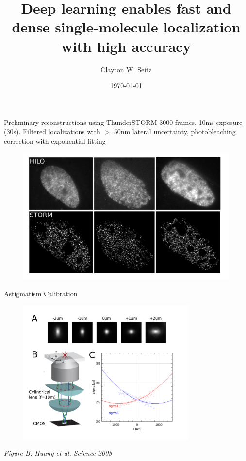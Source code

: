 \documentclass{beamer}			%
\title{Deep learning enables fast and dense single-molecule localization with high accuracy}	%
\author{Clayton W. Seitz}								%
\date{\today}									%
\begin{document}
\begin{frame}
  \titlepage
\end{frame}


%

\begin{frame}{Preliminary reconstructions using ThunderSTORM}
3000 frames, 10ms exposure (30s). Filtered localizations with $>$ 50nm lateral uncertainty, photobleaching correction with exponential fitting
\begin{figure}
\includegraphics[width=12cm]{render/Render.png}
\end{figure}
\end{frame}

\begin{frame}{Astigmatism Calibration}
\begin{figure}
\includegraphics[width=9cm]{Astigmatism.png}
\end{figure}
\textit{Figure B: Huang et al. Science 2008}
\end{frame}
\end{document}
